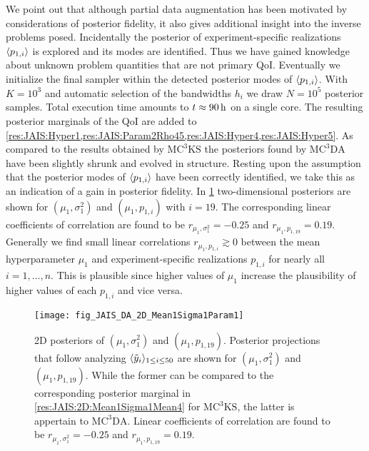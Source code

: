 \par %
We point out that although partial data augmentation has been motivated by considerations of posterior fidelity, it also gives additional insight into the inverse problems posed.
Incidentally the posterior of experiment-specific realizations \(\langle{p_{1,i}}\rangle\) is explored and its modes are identified.
Thus we have gained knowledge about unknown problem quantities that are not primary QoI.
Eventually we initialize the final sampler within the detected posterior modes of \(\langle{p_{1,i}}\rangle\).
With \(K=10^3\) and automatic selection of the bandwidths \(h_i\) we draw \(N=10^5\) posterior samples.
Total execution time amounts to \(t \approx \unit[90]{h}\) on a single core.
The resulting posterior marginals of the QoI are added to \cref{res:JAIS:Hyper1,res:JAIS:Param2Rho45,res:JAIS:Hyper4,res:JAIS:Hyper5}.
As compared to the results obtained by \(\text{MC}^3\text{KS}\) the posteriors found by \(\text{MC}^3\text{DA}\) have been slightly shrunk and evolved in structure.
Resting upon the assumption that the posterior modes of \(\langle{p_{1,i}}\rangle\) have been correctly identified, we take this as an indication of a gain in posterior fidelity.
In \cref{res:JAIS:2D:Mean1Sigma1Param1} two-dimensional posteriors are shown for \((\mu_1,\sigma^2_1)\) and \((\mu_1,p_{1,i})\) with \(i=19\).
The corresponding linear coefficients of correlation are found to be \(r_{\mu_1,\sigma^2_1} = -0.25\) and \(r_{\mu_1,p_{1,19}} = 0.19\).
Generally we find small linear correlations \(r_{\mu_1,p_{1,i}} \gtrsim 0\) between the mean hyperparameter \(\mu_1\) and experiment-specific realizations \(p_{1,i}\) for nearly all \(i=1,\ldots,n\).
This is plausible since higher values of \(\mu_1\) increase the plausibility of higher values of each \(p_{1,i}\) and vice versa.
\begin{figure}[htbp]
  \centering
  \texttt{[image: fig\_JAIS\_DA\_2D\_Mean1Sigma1Param1]}
  \caption[2D posteriors of \((\mu_1,\sigma^2_1)\) and \((\mu_1,p_{1,19})\)]{2D posteriors of \((\mu_1,\sigma^2_1)\) and \((\mu_1,p_{1,19})\).
           Posterior projections that follow analyzing \(\langle{\tilde{y}_i}\rangle_{1 \leq i \leq 50}\) are shown for \((\mu_1,\sigma^2_1)\) and \((\mu_1,p_{1,19})\).
           While the former can be compared to the corresponding posterior marginal in \cref{res:JAIS:2D:Mean1Sigma1Mean4} for \(\text{MC}^3\text{KS}\), the latter is appertain to \(\text{MC}^3\text{DA}\).
           Linear coefficients of correlation are found to be \(r_{\mu_1,\sigma^2_1} = -0.25\) and \(r_{\mu_1,p_{1,19}} = 0.19\).
          }
  \label{res:JAIS:2D:Mean1Sigma1Param1}
\end{figure}